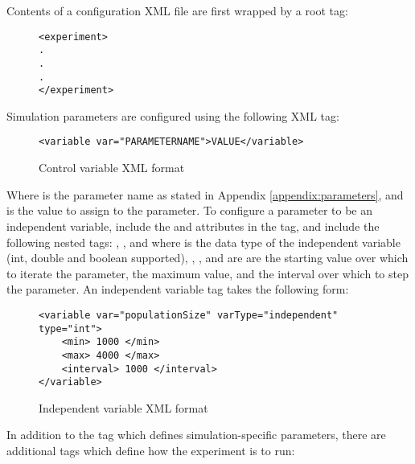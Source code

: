 Contents of a configuration XML file are first wrapped by a root  tag:
\begin{figure}[H]
    \centering
        \begin{BVerbatim}[fontsize=\small]
<experiment>
.
.
.
</experiment>
        \end{BVerbatim}
\end{figure}

Simulation parameters are configured using the following XML tag:

\begin{figure}[H]
    \centering
        \begin{BVerbatim}[fontsize=\small]
<variable var="PARAMETERNAME">VALUE</variable> 
        \end{BVerbatim}
    \caption{Control variable XML format}
    \label{fig:xml_control}
\end{figure}

Where  is the parameter name as stated in Appendix \ref{appendix:parameters}, and  is the value to assign to the parameter. To configure a parameter to be an independent variable, include the  and  attributes in the tag, and include the following nested tags: , , and  where  is the data type of the independent variable (int, double and boolean supported), , , and  are are the starting value over which to iterate the parameter, the maximum value, and the interval over which to step the parameter. An independent variable tag takes the following form:

\vspace{0.5cm}
\begin{figure}[H]
        \centering
        \begin{BVerbatim}[fontsize=\small]
<variable var="populationSize" varType="independent" type="int">
    <min> 1000 </min>
    <max> 4000 </max>
    <interval> 1000 </interval>
</variable> 
        \end{BVerbatim}
    \caption{Independent variable XML format}
    \label{fig:xml_independent}
\end{figure}

In addition to the  tag which defines simulation-specific parameters, there are additional tags which define how the experiment is to run:

